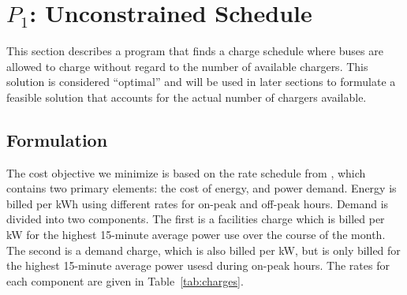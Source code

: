 \section{$P_1$: Unconstrained Schedule \label{sec:unconstrainedSchedule}}
This section describes a program that finds a charge schedule where buses are allowed to charge without regard to the number of available chargers. This solution is considered ``optimal'' and will be used in later sections to formulate a feasible solution that accounts for the actual number of chargers available.
 

 
\subsection{Formulation \label{sec:formulation}} 
The cost objective we minimize is based on the rate schedule from \cite{rocky_mountain_power_rocky_2021}, which contains two primary elements: the cost of energy, and power demand. Energy is billed per kWh using different rates for on-peak and off-peak hours.
Demand is divided into two components.  The first is a facilities charge which is billed per kW for the highest 15-minute average power use over the course of the month. The second is a demand charge, which is also billed per kW, but is only billed for the highest 15-minute average power usesd during on-peak hours. The rates for each component are given in Table~\ref{tab:charges}.  

